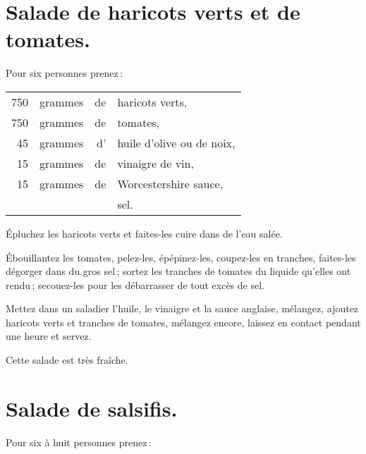 \section*{\centering Salade de haricots verts et de tomates.}
{}

Pour six personnes prenez :

\footnotesize
\begin{longtable}{rrrp{16em}}
    750 & grammes & de & haricots verts,                                                                  \\
    750 & grammes & de & tomates,                                                                         \\
     45 & grammes & d' & huile d'olive ou de noix,                                                        \\
     15 & grammes & de & vinaigre de vin,                                                                 \\
     15 & grammes & de & Worcestershire sauce,                                                            \\
        &         &    & sel.                                                                             \\
\end{longtable}
\normalsize

Épluchez les haricots verts et faites-les cuire dans de l'eau salée.

Ébouillantez les tomates, pelez-les, épépinez-les, coupez-les en tranches,
faites-les dégorger dans du gros sel ; sortez les tranches de tomates du
liquide qu'elles ont rendu ; secouez-les pour les débarrasser de tout excès de
sel.

Mettez dans un saladier l'huile, le vinaigre et la sauce anglaise, mélangez,
ajoutez haricots verts et tranches de tomates, mélangez encore, laissez en contact
pendant une heure et servez.

Cette salade est très fraîche.

\section*{\centering Salade de salsifis.}
{}

Pour six à huit personnes prenez :

